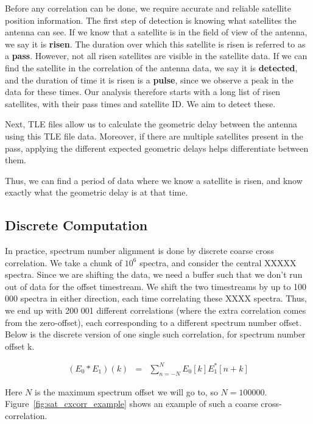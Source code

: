 Before any correlation can be done, we require accurate and reliable satellite position information. 
The first step of detection is knowing what satellites the antenna can see.
If we know that a satellite is in the field of view of the antenna, we say it is \textbf{risen}. 
The duration over which this satellite is risen is referred to as a \textbf{pass}. 
However, not all risen satellites are visible in the satellite data. 
If we can find the satellite in the correlation of the antenna data, we say it is \textbf{detected}, 
and the duration of time it is risen is a \textbf{pulse}, since we observe a peak in the data for these times. 
Our analysis therefore starts with a long list of risen satellites, with their pass times and satellite ID. 
We aim to detect these. 

Next, TLE files allow us to calculate the geometric delay between the antenna using this TLE file data.
Moreover, if there are multiple satellites present in the pass, applying the different expected geometric delays helps 
differentiate between them.

Thus, we can find a period of data where we know a satellite is risen, and know exactly what the geometric delay is at that time.


\subsection{Discrete Computation}

In practice, spectrum number alignment is done by discrete coarse cross correlation.
We take a chunk of $10^6$ spectra, and consider the central XXXXX spectra.
Since we are shifting the data, we need a buffer such that we don't run out of data for the offset timestream.
We shift the two timestreams by up to 100 000 spectra in either direction, each time correlating these XXXX spectra.
Thus, we end up with 200 001 different correlations (where the extra correlation comes from the zero-offset),
each corresponding to a different spectrum number offset.
Below is the discrete version of one single such correlation, for spectrum number offset k.

\begin{eqnarray}
    (E_0*E_1)(k) &=& \sum_{n=-N}^N E_0[k]E_1^*[n+k]
\end{eqnarray}

Here $N$ is the maximum spectrum offset we will go to, so $N=100000$. 
Figure~\ref{fig:sat_cxcorr_example} shows an example of such a coarse cross-correlation.


